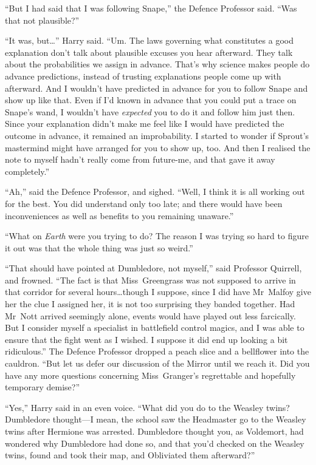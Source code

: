 “But I had said that I was following Snape,” the Defence Professor said. “Was
that not plausible?”

“It was, but…” Harry said. “Um. The laws governing what constitutes a
good explanation don’t talk about plausible excuses you hear afterward. They
talk about the probabilities we assign in advance. That’s why science makes
people do advance predictions, instead of trusting explanations people come up
with afterward. And I wouldn’t have predicted in advance for you to follow
Snape and show up like that. Even if I’d known in advance that you could put a
trace on Snape’s wand, I wouldn’t have \emph{expected} you to do it and follow
him just then. Since your explanation didn’t make me feel like I would have
predicted the outcome in advance, it remained an improbability. I started to
wonder if Sprout’s mastermind might have arranged for you to show up, too. And
then I realised the note to myself hadn’t really come from future-me, and that
gave it away completely.”

“Ah,” said the Defence Professor, and sighed. “Well, I think it is all working
out for the best. You did understand only too late; and there would have been
inconveniences as well as benefits to you remaining unaware.”

“What on \emph{Earth} were you trying to do? The reason I was trying so hard to
figure it out was that the whole thing was just so weird.”

“That should have pointed at Dumbledore, not myself,” said Professor Quirrell,
and frowned. “The fact is that Miss~Greengrass was not supposed to arrive in
that corridor for several hours…though I suppose, since I did have
Mr~Malfoy give her the clue I assigned her, it is not too surprising they
banded together. Had Mr~Nott arrived seemingly alone, events would have played
out less farcically. But I consider myself a specialist in battlefield control
magics, and I was able to ensure that the fight went as I wished. I suppose it
did end up looking a bit ridiculous.” The Defence Professor dropped a peach
slice and a bellflower into the cauldron. “But let us defer our discussion of
the Mirror until we reach it. Did you have any more questions concerning
Miss~Granger’s regrettable and hopefully temporary demise?”

“Yes,” Harry said in an even voice. “What did you do to the Weasley twins?
Dumbledore thought—I mean, the school saw the Headmaster go to the Weasley
twins after Hermione was arrested. Dumbledore thought you, as Voldemort, had
wondered why Dumbledore had done so, and that you’d checked on the Weasley
twins, found and took their map, and Obliviated them afterward?”

